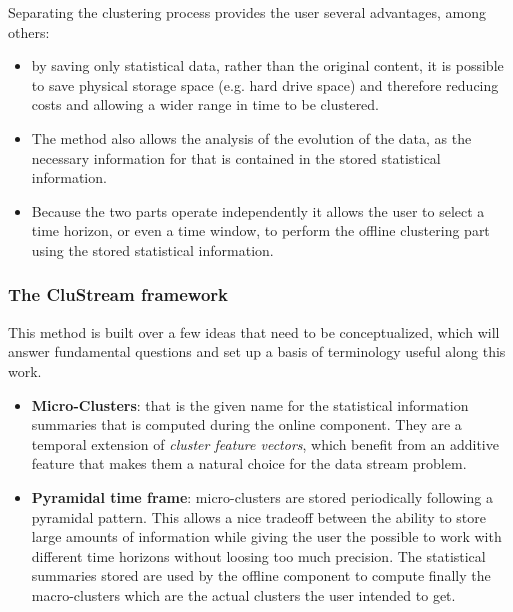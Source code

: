 \documentclass[10pt, conference, compsocconf]{IEEEtran}
\begin{document}
Separating the clustering process provides the user several advantages, among others:

\begin{itemize}
 \item by saving only statistical data, rather than the original content, it is possible to save physical storage space (e.g. hard drive space) and therefore reducing costs and allowing a wider range in time to be clustered.
 
 \item The method also allows the analysis of the evolution of the data, as the necessary information for that is contained in the stored statistical information.
 
 \item Because the two parts operate independently it allows the user to select a time horizon, or even a time window, to perform the offline clustering part using the stored statistical information.
\end{itemize}

\subsubsection{The CluStream framework}

This method is built over a few ideas that need to be conceptualized, which will answer fundamental questions and set up a basis of terminology useful along this work.

\begin{itemize}
 \item \textbf{Micro-Clusters}: that is the given name for the statistical information summaries that is computed during the online component. They are a temporal extension of \textit{cluster feature vectors}\cite{zhang96birch}, which benefit from an additive feature that makes them a natural choice for the data stream problem\cite{clustreamOrig}.
 
 \item \textbf{Pyramidal time frame}: micro-clusters are stored periodically following a pyramidal pattern. This allows a nice tradeoff between the ability to store large amounts of information while giving the user the possible to work with different time horizons without loosing too much precision. The statistical summaries stored are used by the offline component to compute finally the macro-clusters which are the actual clusters the user intended to get.
\end{itemize}
\end{document}
